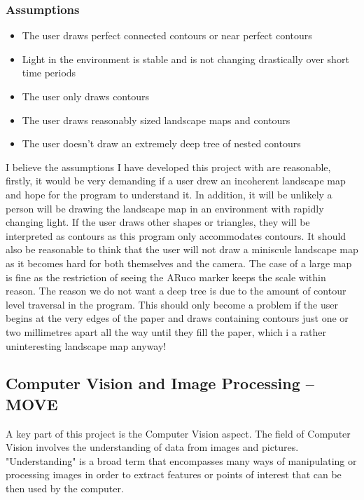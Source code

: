 \documentclass[11pt]{article}
\begin{document}
\subsubsection{Assumptions}
\begin{itemize}
    \item The user draws perfect connected contours or near 
    	  perfect contours
    \item Light in the environment is stable and is not
    	  changing drastically over short time periods
    \item The user only draws contours
    \item The user draws reasonably sized landscape maps and contours
    \item The user doesn't draw an extremely deep tree of nested contours
\end{itemize}

I believe the assumptions I have developed this project with are reasonable,
firstly, it would be very demanding if a user drew an incoherent landscape
map and hope for the program to understand it. In addition, it will be
unlikely a person will be drawing the landscape map in an environment
with rapidly changing light. If the user draws other shapes or triangles,
they will be interpreted as contours as this program only accommodates contours.
It should also be reasonable to think that the user will not draw a 
miniscule landscape map as it becomes hard for both themselves and the camera.
The case of a large map is fine as the restriction of seeing the ARuco 
marker keeps the scale within reason. The reason we do not want a deep
tree is due to the amount of contour level traversal in the program. This
should only become a problem if the user begins at the very edges of the paper
and draws containing contours just one or two millimetres apart all the
way until they fill the paper, which i a rather uninteresting landscape map
anyway!










\subsection{Computer Vision and Image Processing -- MOVE}
A key part of this project is the Computer Vision aspect. The field of
Computer Vision involves the understanding of data from images and pictures.
"Understanding" is a broad term that encompasses many ways of manipulating or
processing images in order to extract features or points of interest that
can be then used by the computer.
\end{document}

